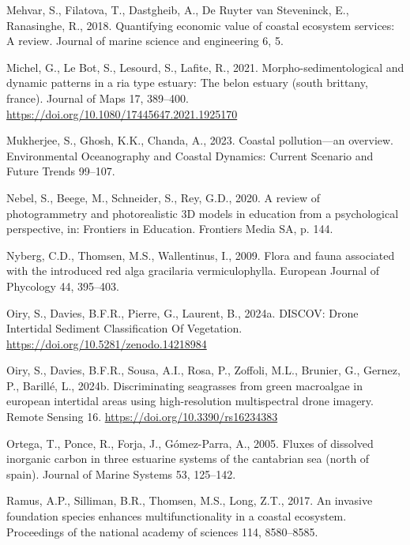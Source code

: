 \documentclass[
  letterpaper,
  DIV=11,
  numbers=noendperiod]{scrartcl}
\newlength{\cslhangindent}
\newenvironment{CSLReferences}[2] %
 {\begin{list}{}{%
  \setlength{\itemindent}{0pt}
  \setlength{\leftmargin}{0pt}
  \setlength{\parsep}{0pt}
  \ifodd #1
   \setlength{\leftmargin}{\cslhangindent}
   \setlength{\itemindent}{-1\cslhangindent}
  \fi
  \setlength{\itemsep}{#2\baselineskip}}}
 {\end{list}}
\begin{document}
\begin{CSLReferences}{1}{0}
Mehvar, S., Filatova, T., Dastgheib, A., De Ruyter van Steveninck, E.,
Ranasinghe, R., 2018. Quantifying economic value of coastal ecosystem
services: A review. Journal of marine science and engineering 6, 5.

Michel, G., Le Bot, S., Lesourd, S., Lafite, R., 2021.
Morpho-sedimentological and dynamic patterns in a ria type estuary: The
belon estuary (south brittany, france). Journal of Maps 17, 389--400.
\url{https://doi.org/10.1080/17445647.2021.1925170}

Mukherjee, S., Ghosh, K.K., Chanda, A., 2023. Coastal pollution---an
overview. Environmental Oceanography and Coastal Dynamics: Current
Scenario and Future Trends 99--107.

Nebel, S., Beege, M., Schneider, S., Rey, G.D., 2020. A review of
photogrammetry and photorealistic 3D models in education from a
psychological perspective, in: Frontiers in Education. Frontiers Media
SA, p. 144.

Nyberg, C.D., Thomsen, M.S., Wallentinus, I., 2009. Flora and fauna
associated with the introduced red alga gracilaria vermiculophylla.
European Journal of Phycology 44, 395--403.

Oiry, S., Davies, B.F.R., Pierre, G., Laurent, B., 2024a. {DISCOV: Drone
Intertidal Sediment Classification Of Vegetation}.
\url{https://doi.org/10.5281/zenodo.14218984}

Oiry, S., Davies, B.F.R., Sousa, A.I., Rosa, P., Zoffoli, M.L., Brunier,
G., Gernez, P., Barillé, L., 2024b. Discriminating seagrasses from green
macroalgae in european intertidal areas using high-resolution
multispectral drone imagery. Remote Sensing 16.
\url{https://doi.org/10.3390/rs16234383}

Ortega, T., Ponce, R., Forja, J., Gómez-Parra, A., 2005. Fluxes of
dissolved inorganic carbon in three estuarine systems of the cantabrian
sea (north of spain). Journal of Marine Systems 53, 125--142.

Ramus, A.P., Silliman, B.R., Thomsen, M.S., Long, Z.T., 2017. An
invasive foundation species enhances multifunctionality in a coastal
ecosystem. Proceedings of the national academy of sciences 114,
8580--8585.


\end{CSLReferences}
\end{document}
